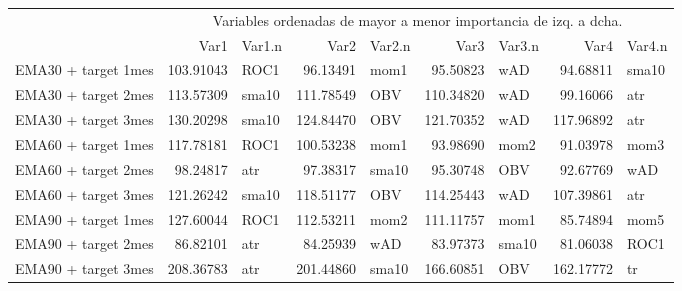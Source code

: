 \documentclass[]{article}
\newenvironment{Shaded}{\begin{snugshade}}{\end{snugshade}}
\newcommand{\CommentTok}[1]{\textcolor[rgb]{0.56,0.35,0.01}{\textit{#1}}}
\begin{document}
\begin{table}[H]
\centering\begingroup\fontsize{10}{12}\selectfont

\begin{tabular}{l|r|l|r|l|r|l|r|l}
\hline
\multicolumn{1}{c|}{ } & \multicolumn{8}{|c}{Variables ordenadas de mayor a menor importancia de izq. a dcha.} \\
\cline{2-9}
  & Var1 & Var1.n & Var2 & Var2.n & Var3 & Var3.n & Var4 & Var4.n\\
\hline
EMA30 + target 1mes & 103.91043 & ROC1 & 96.13491 & mom1 & 95.50823 & wAD & 94.68811 & sma10\\
\hline
EMA30 + target 2mes & 113.57309 & sma10 & 111.78549 & OBV & 110.34820 & wAD & 99.16066 & atr\\
\hline
EMA30 + target 3mes & 130.20298 & sma10 & 124.84470 & OBV & 121.70352 & wAD & 117.96892 & atr\\
\hline
EMA60 + target 1mes & 117.78181 & ROC1 & 100.53238 & mom1 & 93.98690 & mom2 & 91.03978 & mom3\\
\hline
EMA60 + target 2mes & 98.24817 & atr & 97.38317 & sma10 & 95.30748 & OBV & 92.67769 & wAD\\
\hline
EMA60 + target 3mes & 121.26242 & sma10 & 118.51177 & OBV & 114.25443 & wAD & 107.39861 & atr\\
\hline
EMA90 + target 1mes & 127.60044 & ROC1 & 112.53211 & mom2 & 111.11757 & mom1 & 85.74894 & mom5\\
\hline
EMA90 + target 2mes & 86.82101 & atr & 84.25939 & wAD & 83.97373 & sma10 & 81.06038 & ROC1\\
\hline
EMA90 + target 3mes & 208.36783 & atr & 201.44860 & sma10 & 166.60851 & OBV & 162.17772 & tr\\
\hline
\end{tabular}\endgroup{}
\end{table}

\begin{Shaded}
\end{Shaded}
\end{document}
